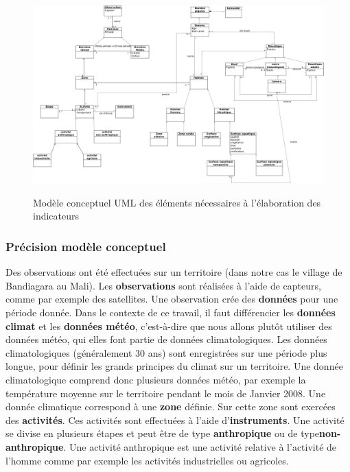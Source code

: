 \begin{landscape}
\begin{figure}[h]
\includegraphics[width=23cm]{DiagrammeUML}\\
\caption{\label{UML_malaria} Modèle conceptuel UML des éléments nécessaires à l'élaboration des indicateurs}
\end{figure}
\end{landscape}

\subsubsection{Précision modèle conceptuel}

Des observations ont été effectuées sur un territoire (dans notre cas le village de Bandiagara au Mali). Les \textbf{observations} sont réalisées à l'aide de capteurs, comme par exemple des satellites. Une observation crée des \textbf{données} pour une période donnée. Dans le contexte de ce travail, il faut différencier les \textbf{données climat} et les \textbf{données météo}, c'est-à-dire que nous allons plutôt utiliser des données météo, qui elles font partie de données climatologiques. Les données climatologiques (généralement 30 ans) sont enregistrées sur une période plus longue, pour définir les grands principes du climat sur un territoire. Une donnée climatologique comprend donc plusieurs données météo, par exemple la température moyenne sur le territoire pendant le mois de Janvier 2008.
Une donnée climatique correspond à une \textbf{zone} définie. Sur cette zone sont exercées des \textbf{activités}. Ces activités sont effectuées à l'aide d'\textbf{instruments}. Une activité se divise en plusieurs étapes et peut être de type \textbf{anthropique} ou de type\textbf{non-anthropique}. Une activité anthropique est une activité relative à l'activité de l'homme comme par exemple les activités industrielles ou agricoles.

